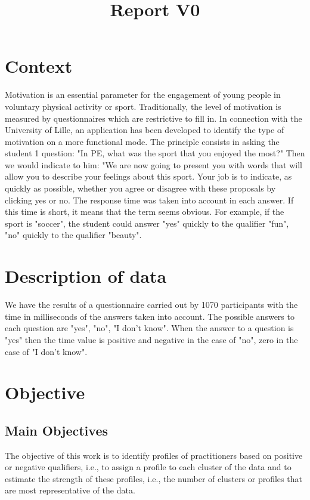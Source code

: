 \documentclass[12pt]{article}
\title{Report V0}
\begin{document}
    \maketitle
    
\tableofcontents

\section{Context}

Motivation is an essential parameter for the engagement of young people in voluntary physical activity or sport. Traditionally, the level of motivation is measured by questionnaires which are restrictive to fill in. In connection with the University of Lille, an application has been developed to identify the type of motivation on a more functional mode. 
The principle consists in asking the student 1 question: 
"In PE, what was the sport that you enjoyed the most?"
Then we would indicate to him:
"We are now going to present you with words that will allow you to describe your feelings about this sport. Your job is to indicate, as quickly as possible, whether you agree or disagree with these proposals by clicking yes or no.
The response time was taken into account in each answer. If this time is short, it means that the term seems obvious.
For example, if the sport is "soccer", the student could answer "yes" quickly to the qualifier "fun", "no" quickly to the qualifier "beauty".

\section{Description of data}
We have the results of a questionnaire carried out by 1070 participants with the time in milliseconds of the answers taken into account. The possible answers to each question are "yes", "no", "I don't know". When the answer to a question is "yes" then the time value is positive and negative in the case of "no", zero in the case of "I don't know".


\section{ Objective}

\subsection{Main Objectives}

The objective of this work is to identify profiles of practitioners based on positive or negative qualifiers, i.e., to assign a profile to each cluster of the data and to estimate the strength of these profiles, i.e., the number of clusters or profiles that are most representative of the data.
\end{document}
